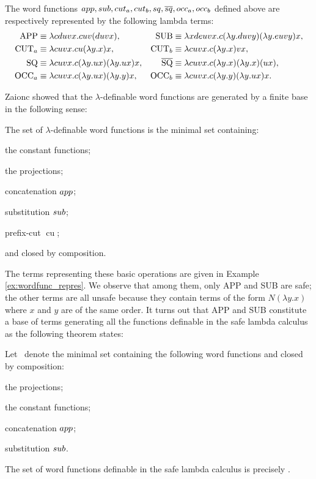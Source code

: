 \begin{example}
\label{ex:wordfunc_repres}
  The word functions $\mathop{app}, \mathop{sub}, \mathop{cut_a}, \mathop{cut_b}, 
  \mathop{sq}, \mathop{\overline{sq}}, 
    \mathop{occ_a}, \mathop{occ_b}$ defined above are respectively represented by the following lambda terms:
\begin{align*}
  {\rm APP} &\equiv \lambda c d u v x.c u v(d u v x), & {\rm SUB} &\equiv \lambda x d e u v x.c(\lambda y.d u v y)(\lambda y . e u v y) x, \\
  {\rm CUT}_a &\equiv \lambda c u v x . c u (\lambda y.x) x,  & {\rm CUT}_b &\equiv \lambda c u v x . c (\lambda y.x) v x, \\
  {\rm SQ} &\equiv \lambda c u v x . c (\lambda y.u x) (\lambda y.u x) x, & \overline{{\rm SQ}} &\equiv \lambda c u v x . c (\lambda y.x) (\lambda y.x) (u x), \\
  {\rm OCC}_a &\equiv \lambda c u v x . c (\lambda y.u x) (\lambda y.y) x, & {\rm OCC}_b &\equiv \lambda c u v x . c (\lambda y.y) (\lambda y.u x) x.
\end{align*}
\end{example}

Zaionc \cite{DBLP:journals/tcs/Zaionc87} showed that 
the $\lambda$-definable word functions are generated by a finite base in the following sense:
\begin{theorem}
The set of $\lambda$-definable word functions is the minimal set containing:
\begin{inparaenum}[(i)]
  \item the constant functions;
  \item the projections;
  \item concatenation $\mathop{app}$;
  \item substitution $\mathop{sub}$;
  \item prefix-cut $\mathop{cut_a}$;
\end{inparaenum}
and closed by composition.
\end{theorem}

The terms representing these basic operations are given in Example \ref{ex:wordfunc_repres}.
We observe that among them, only {\rm APP} and {\rm SUB} are
safe; the other terms are all unsafe because they contain terms of
the form $ N (\lambda y .x)$ where $x$ and $y$ are of the same
order. It turns out that {\rm APP} and {\rm SUB} constitute a base
of terms generating all the functions definable in the safe lambda
calculus as the following theorem states:
\begin{theorem}
\label{thm:wordfunctions_safely_definable}
Let \safedefset\ denote the minimal set containing the following word functions and closed by composition:
\begin{asparaenum}[(i)]
  \item the projections;
  \item the constant functions;
  \item concatenation $\mathop{app}$;
  \item substitution $\mathop{sub}$.
\end{asparaenum}
The set of word functions definable in the safe lambda calculus is
precisely \safedefset.
\end{theorem}


